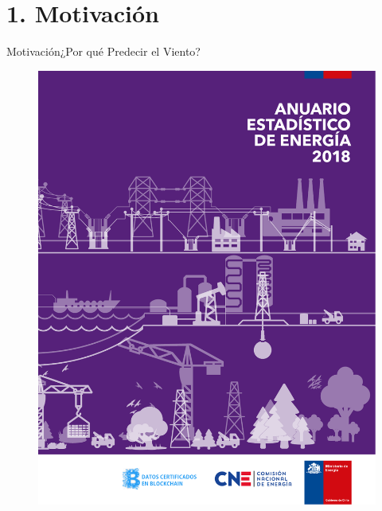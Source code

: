 \documentclass[mathserif,10pt]{beamer}
\begin{document}
\section{1. Motivación}
\begin{frame}{Motivación}{¿Por qué Predecir el Viento?}
\begin{figure}
	\centering
	\includegraphics[width=1.0\linewidth,page=30,trim={2cm 18cm 2.5cm 3cm},clip]{fig/01/Anuario-CNE-2018}
	\vspace{3mm}

\end{figure}
\end{frame}
\end{document}
